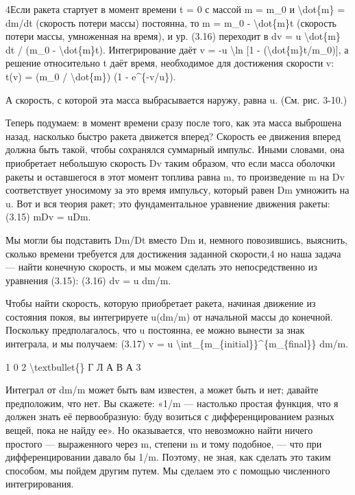 \documentclass[10pt,oneside]{article}
\begin{document}
4Если ракета стартует в момент времени t = 0 с массой m = m\_0 и \textbackslash{}dot\{m\} = dm/dt (скорость потери массы) постоянна, то m = m\_0 - \textbackslash{}dot\{m\}t (скорость потери массы, умноженная на время), и ур. (3.16) переходит в dv = u \textbackslash{}dot\{m\} dt / (m\_0 - \textbackslash{}dot\{m\}t). Интегрирование даёт v = -u \textbackslash{}ln [1 - (\textbackslash{}dot\{m\}t/m\_0)], а решение относительно t даёт время, необходимое для достижения скорости v: t(v) = (m\_0 / \textbackslash{}dot\{m\}) (1 - e\textasciicircum{}\{-v/u\}).\par

А скорость, с которой эта масса выбрасывается наружу, равна u. (См. рис. 3-10.)\par

Теперь подумаем: в момент времени сразу после того, как эта масса выброшена назад, насколько быстро ракета движется вперед? Скорость ее движения вперед должна быть такой, чтобы сохранялся суммарный импульс. Иными словами, она приобретает небольшую скорость Dv таким образом, что если масса оболочки ракеты и оставшегося в этот момент топлива равна m, то произведение m на Dv соответствует уносимому за это время импульсу, который равен Dm умножить на u. Вот и вся теория ракет; это фундаментальное уравнение движения ракеты: (3.15) mDv = uDm.\par

Мы могли бы подставить Dm/Dt вместо Dm и, немного повозившись, выяснить, сколько времени требуется для достижения заданной скорости,4 но наша задача --- найти конечную скорость, и мы можем сделать это непосредственно из уравнения (3.15): (3.16) dv = u dm/m.\par

Чтобы найти скорость, которую приобретает ракета, начиная движение из состояния покоя, вы интегрируете u(dm/m) от начальной массы до конечной. Поскольку предполагалось, что u постоянна, ее можно вынести за знак интеграла, и мы получаем: (3.17) v = u \textbackslash{}int\_\{m\_\{initial\}\}\textasciicircum{}\{m\_\{final\}\} dm/m.\par

1 0 2 \textbackslash{}textbullet\{\} Г Л А В А  3\par

Интеграл от dm/m может быть вам известен, а может быть и нет; давайте предположим, что нет. Вы скажете: «1/m --- настолько простая функция, что я должен знать её первообразную: буду возиться с дифференцированием разных вещей, пока не найду ее». Но оказывается, что невозможно найти ничего простого --- выраженного через m, степени m и тому подобное, --- что при дифференцировании давало бы 1/m. Поэтому, не зная, как сделать это таким способом, мы пойдем другим путем. Мы сделаем это с помощью численного интегрирования.\par
\end{document}
